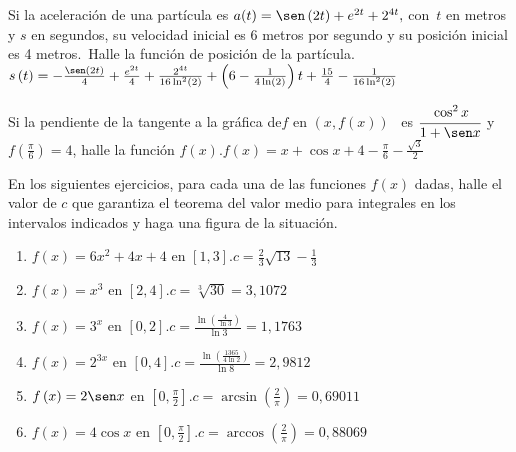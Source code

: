 \begin{ejer}{Si la aceleración de una partícula es $a(t)=\sen \left( 2t\right) +e^{2t}+2^{4t},$ con\ $t$ en metros y $s$ en
segundos, su velocidad inicial es 6 metros por segundo y su posición inicial es 4 metros.\ Halle la función de posición de la partícula.}{$s\left( t\right) =-\frac{\sen \left( 2t\right) }{4}+\frac{e^{2t}}{4}+\frac{2^{4t}}{16\ln ^{2}\left( 2\right) }+\left( 6-\frac{1}{4\ln \left(2\right) }\right) t+\frac{15}{4}-\frac{1}{16\ln ^{2}\left( 2\right) }$}
\end{ejer}


\begin{ejer}{Si la pendiente de la tangente a la gráfica de$f$ en $\left(x,f\left( x\right) \right)$ \ es $\cfrac{\cos	^{2}x}{1+\sen x}$ y $f\left( \frac{\pi }{6}\right) =4$, halle la función
$f\left( x\right).$}{$f\left( x\right) =x+\cos x+4-\frac{\pi}{6}-\frac{\sqrt{3}}{2}$}
\end{ejer}


\begin{ejer}{En los siguientes ejercicios, para cada una de las funciones \textit{$f\left(x\right) $} dadas, halle el valor de \textit{$c$} que garantiza el  teorema del valor medio para integrales en los intervalos indicados y haga una figura de la situación.}



\begin{enumerate}

\item {$f\left( x\right) =6x^{2}+4x+4$ en $\left[1,3\right].$}{$c=\frac{2}{3}\sqrt{13}-\frac{1}{3}$}

\item {$f\left( x\right) =x^{3}$ en $\left[ 2,4\right] .$}{$c=\sqrt[3]{30}=3,1072$}

\item {$f\left( x\right) =3^{x}$ en $\left[ 0,2\right] $.}{$c=\frac{\ln \left( \frac{4}{\ln 3}\right) }{\ln 3}=1,1763$}

\item {$f\left( x\right) =2^{3x}$ en $\left[ 0,4\right] $.}{$c=\frac{\ln \left( \frac{1365}{4\ln 2}\right) }{\ln 8}=2,9812$}

\item {$f\left( x\right) =2\sen x$ en $\left[ 0,\frac{\pi }{2}\right] $.}{$c=\arcsin \left( \frac{2}{\pi }\right) =0,69011$}

\item {$f\left( x\right) =4\cos x$ en $\left[ 0,\frac{\pi }{2}\right] $.}{$c=\arccos \left( \frac{2}{\pi }\right)=0,88069$}
\end{enumerate}
\end{ejer}



